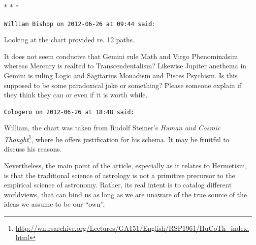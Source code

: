 
\begin{center}* * *\end{center}

\begin{footnotesize}
\begin{sffamily}
\texttt{William Bishop on 2012-06-26 at 09:44 said:}

Looking at the chart provided re. 12 paths.

It does not seem conducive that Gemini rule Math and Virgo Phenominalsim whereas Mercury is realted to Transcendentalism? Likewise Jupiter anethema in Gemini is ruling Logic and Sagitarius Monadism and Pisces Psychism. Is this supposed to be some paradoxical joke or something? Please someone explain if they think they can or even if it is worth while.

\hfill

\texttt{Cologero on 2012-06-26 at 18:48 said:}

William, the chart was taken from Rudolf Steiner's \textit{Human and Cosmic Thought}\footnote{\url{http://wn.rsarchive.org/Lectures/GA151/English/RSP1961/HuCoTh_index.html}}, where he offers justification for his schema. It may be fruitful to discuss his reasons.

Nevertheless, the main point of the article, especially as it relates to Hermetism, is that the traditional science of astrology is not a primitive precursor to the empirical science of astronomy. Rather, its real intent is to catalog different worldviews, that can bind us as long as we are unaware of the true source of the ideas we assume to be our ``own''.

\end{sffamily}
\end{footnotesize}

